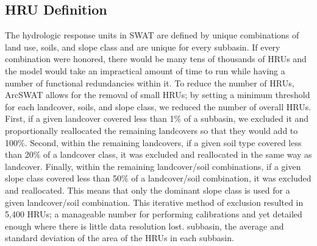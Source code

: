 \subsection{HRU Definition}\label{sec:hru_definition}

The hydrologic response units in SWAT are defined by unique combinations of land
use, soils, and slope class and are unique for every subbasin.
If every combination were honored, there would be many tens of thousands of HRUs
and the model would take an impractical amount of time to run while having a
number of functional redundancies within it.
To reduce the number of HRUs, ArcSWAT allows for the removal of small HRUs; by
setting a minimum threshold for each landcover, soils, and slope class, we
reduced the number of overall HRUs.
First, if a given landcover covered less than 1\% of a subbasin, we excluded it
and proportionally reallocated the remaining landcovers so that they would add
to 100\%.
Second, within the remaining landcovers, if a given soil type covered less than
20\% of a landcover class, it was excluded and reallocated in the same way as
landcover.
Finally, within the remaining landcover/soil combinations, if a given slope
class covered less than 50\% of a landcover/soil combination, it was excluded
and reallocated. This means that only the dominant slope class is used for a
given landcover/soil combination.
This iterative method of exclusion resulted in 5,400 HRUs; a manageable number
for performing calibrations and yet detailed enough where there is little data
resolution lost. %
subbasin, the average and standard deviation of the area of the HRUs in each
subbasin.